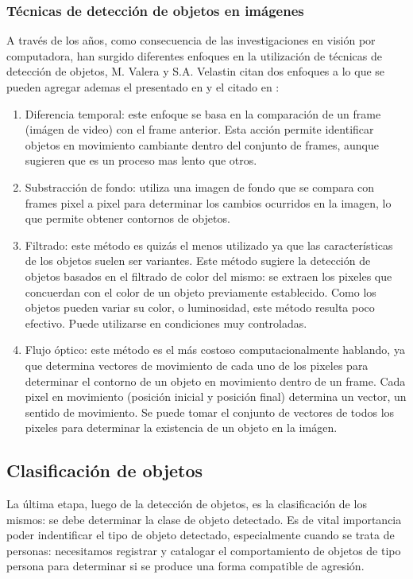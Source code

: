 \documentclass[a4paper,12pt,twoside]{article}
\begin{document}
\subsubsection{Técnicas de detección de objetos en imágenes}
A través de los años, como consecuencia de las investigaciones en visión por computadora, han surgido	diferentes enfoques en la utilización de técnicas de detección de objetos, M. Valera y S.A. Velastin \cite{valera} citan dos enfoques a lo que se pueden agregar ademas el presentado en \cite{nidhi} y el citado en \cite{barron}:
\begin{enumerate}
	\baselineskip 0pt
	\item Diferencia temporal: 
	este enfoque se basa en la comparación de un frame (imágen de video) con el frame anterior. Esta acción permite identificar objetos en movimiento cambiante dentro del conjunto de frames, aunque sugieren que es un proceso mas lento que otros.\\	
	\item Substracción de fondo: utiliza una imagen de fondo que se compara con frames pixel a pixel para determinar los cambios ocurridos en la imagen, lo que permite obtener contornos de objetos.\\
	\item Filtrado: este método es quizás el menos utilizado ya que las características de los objetos suelen ser variantes. Este método sugiere la detección de objetos basados en el filtrado de color del mismo: se extraen los pixeles que concuerdan con el color de un objeto previamente establecido. Como los objetos pueden variar su color, o luminosidad, este método resulta poco efectivo. Puede utilizarse en condiciones muy controladas.\\
	\item Flujo óptico: este método es el más costoso computacionalmente hablando, ya que determina vectores de movimiento de cada uno de los pixeles para determinar el contorno de un objeto en movimiento dentro de un frame. Cada pixel en movimiento (posición inicial y posición final) determina un vector, un sentido de movimiento. Se puede tomar el conjunto de vectores de todos los pixeles para determinar la existencia de un objeto en la imágen.\\
\end{enumerate}	\baselineskip 14pt
	
\subsection{Clasificación de objetos}
La última etapa, luego de la detección de objetos, es la clasificación de los mismos: se debe determinar la clase de objeto detectado. Es de vital importancia poder indentificar el tipo de objeto detectado, especialmente cuando se trata de personas: necesitamos registrar y catalogar el comportamiento de objetos de tipo persona para determinar si se produce una forma compatible de agresión.
\end{document}
